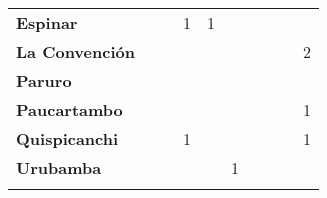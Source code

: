 \begin{tabular}{lccccccccc}
	\textbf{Espinar}       					                 						   
	&\cellcolor[HTML]{FCC46C} 					&\cellcolor[HTML]{FCC46C} 		 
	&1											&1									
	&\cellcolor[HTML]{FCC46C}				    &\cellcolor[HTML]{FCC46C}
	&\cellcolor[HTML]{FCC46C} 					&\cellcolor[HTML]{FCC46C}
	&\cellcolor[HTML]{FCC46C} \\
	\textbf{La Convención}                      
	&\cellcolor[HTML]{FCC46C}              		&\cellcolor[HTML]{FCC46C} 			
	&\cellcolor[HTML]{FCC46C}					&\cellcolor[HTML]{FCC46C}  					&\cellcolor[HTML]{FCC46C} 		            &\cellcolor[HTML]{FCC46C} 					
	&\cellcolor[HTML]{FCC46C} 					&\cellcolor[HTML]{FCC46C}
	&2\\
	\textbf{Paruro}                            
	&\cellcolor[HTML]{FCC46C}              	    &\cellcolor[HTML]{FCC46C}        			&\cellcolor[HTML]{FCC46C}                   &\cellcolor[HTML]{FCC46C}   				&\cellcolor[HTML]{FCC46C} 					&\cellcolor[HTML]{FCC46C}		 			&\cellcolor[HTML]{FCC46C}					&\cellcolor[HTML]{FCC46C}
	&\cellcolor[HTML]{FCC46C}\\
	\textbf{Paucartambo}               		                       
	&\cellcolor[HTML]{FCC46C} 					&\cellcolor[HTML]{FCC46C}					&\cellcolor[HTML]{FCC46C}					
	&\cellcolor[HTML]{FCC46C}					&\cellcolor[HTML]{FCC46C}                   &\cellcolor[HTML]{FCC46C} 					&\cellcolor[HTML]{FCC46C}
	&\cellcolor[HTML]{FCC46C}					&1\\
	\textbf{Quispicanchi}                                         	                  
	&\cellcolor[HTML]{FCC46C} 					
	&\cellcolor[HTML]{FCC46C}					&1
	&\cellcolor[HTML]{FCC46C}					&\cellcolor[HTML]{FCC46C} 
	&\cellcolor[HTML]{FCC46C}					&\cellcolor[HTML]{FCC46C}
	&\cellcolor[HTML]{FCC46C}					&1\\
	\textbf{Urubamba}                                                    
    &\cellcolor[HTML]{FCC46C}      
	&\cellcolor[HTML]{FCC46C}					&\cellcolor[HTML]{FCC46C}		
	&\cellcolor[HTML]{FCC46C}					&1
	&\cellcolor[HTML]{FCC46C}					&\cellcolor[HTML]{FCC46C}
	&\cellcolor[HTML]{FCC46C}					&\cellcolor[HTML]{FCC46C}\\
	&\multicolumn{1}{l}{}                       &\multicolumn{1}{l}{}            &\multicolumn{1}{l}{}                         
	&\multicolumn{1}{l}{}                       &\multicolumn{1}{l}{}            &\multicolumn{1}{l}{}                       &\multicolumn{1}{l}{}                       &\multicolumn{1}{l}{}            &\multicolumn{1}{l}{}    
\end{tabular}